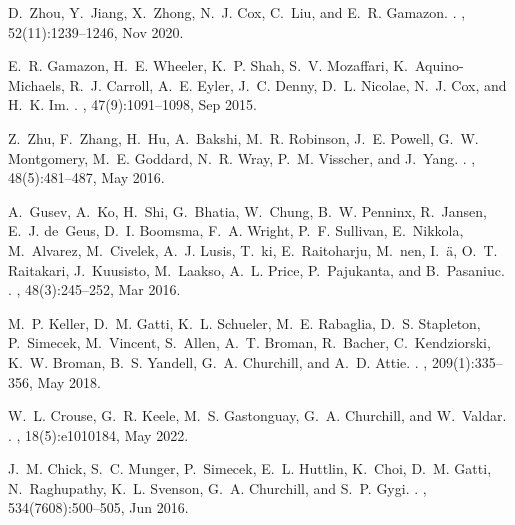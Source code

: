 \documentclass[
]{article}
\begin{document}
\begin{thebibliography}{100}
D.~Zhou, Y.~Jiang, X.~Zhong, N.~J. Cox, C.~Liu, and E.~R. Gamazon.
.
, 52(11):1239--1246, Nov 2020.

E.~R. Gamazon, H.~E. Wheeler, K.~P. Shah, S.~V. Mozaffari, K.~Aquino-Michaels,
  R.~J. Carroll, A.~E. Eyler, J.~C. Denny, D.~L. Nicolae, N.~J. Cox, and H.~K.
  Im.
.
, 47(9):1091--1098, Sep 2015.

Z.~Zhu, F.~Zhang, H.~Hu, A.~Bakshi, M.~R. Robinson, J.~E. Powell, G.~W.
  Montgomery, M.~E. Goddard, N.~R. Wray, P.~M. Visscher, and J.~Yang.
.
, 48(5):481--487, May 2016.

A.~Gusev, A.~Ko, H.~Shi, G.~Bhatia, W.~Chung, B.~W. Penninx, R.~Jansen, E.~J.
  de~Geus, D.~I. Boomsma, F.~A. Wright, P.~F. Sullivan, E.~Nikkola, M.~Alvarez,
  M.~Civelek, A.~J. Lusis, T.~ki, E.~Raitoharju, M.~nen, I.~{\"a}, O.~T.
  Raitakari, J.~Kuusisto, M.~Laakso, A.~L. Price, P.~Pajukanta, and
  B.~Pasaniuc.
.
, 48(3):245--252, Mar 2016.

M.~P. Keller, D.~M. Gatti, K.~L. Schueler, M.~E. Rabaglia, D.~S. Stapleton,
  P.~Simecek, M.~Vincent, S.~Allen, A.~T. Broman, R.~Bacher, C.~Kendziorski,
  K.~W. Broman, B.~S. Yandell, G.~A. Churchill, and A.~D. Attie.
.
, 209(1):335--356, May 2018.

W.~L. Crouse, G.~R. Keele, M.~S. Gastonguay, G.~A. Churchill, and W.~Valdar.
.
, 18(5):e1010184, May 2022.

J.~M. Chick, S.~C. Munger, P.~Simecek, E.~L. Huttlin, K.~Choi, D.~M. Gatti,
  N.~Raghupathy, K.~L. Svenson, G.~A. Churchill, and S.~P. Gygi.
.
, 534(7608):500--505, Jun 2016.


\end{thebibliography}
\end{document}
